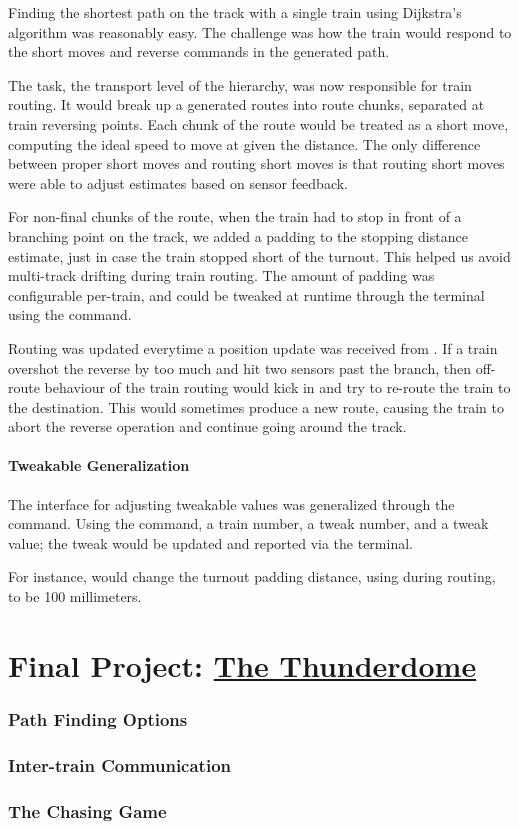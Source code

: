 \documentclass[pdftex,10pt,a4paper]{article}
\begin{document}
Finding the shortest path on the track with a single train using
Dijkstra's algorithm was reasonably easy. The challenge was how the
train would respond to the short moves and reverse commands in the
generated path.

The  task, the transport level of the hierarchy, was now
responsible for train routing. It would break up a generated routes
into route chunks, separated at train reversing points. Each chunk of
the route would be treated as a short move, computing the ideal speed
to move at given the distance. The only difference between proper
short moves and routing short moves is that routing short moves were
able to adjust estimates based on sensor feedback.

For non-final chunks of the route, when the train had to stop in front
of a branching point on the track, we added a padding to the stopping
distance estimate, just in case the train stopped short of the
turnout. This helped us avoid multi-track drifting during train
routing. The amount of padding was configurable per-train, and could
be tweaked at runtime through the terminal using the  command.

Routing was updated everytime a position update was received from
. If a train overshot the reverse by too much and hit two
sensors past the branch, then off-route behaviour of the train routing
would kick in and try to re-route the train to the destination. This
would sometimes produce a new route, causing the train to abort the
reverse operation and continue going around the track.

\subsection*{Tweakable Generalization}

The interface for adjusting tweakable values was generalized through
the  command. Using the command, a train number, a tweak
number, and a tweak value; the tweak would be updated and reported
via the terminal.

For instance,  would change the turnout padding
distance, using during routing, to be 100 millimeters.

\part*{Final Project: \underline{The Thunderdome}}

\section*{Path Finding Options}

\section*{Inter-train Communication}

\section*{The Chasing Game}
\end{document}
